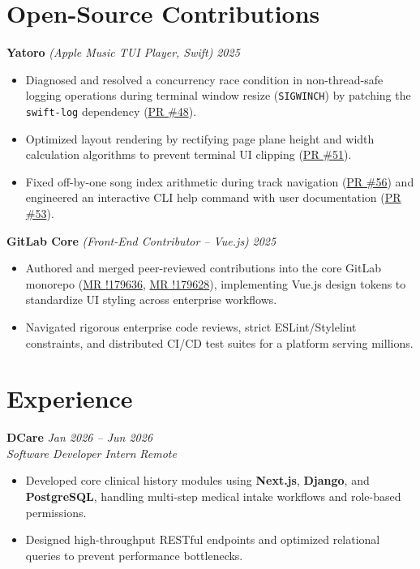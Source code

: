 \documentclass[10pt,a4paper]{article}
\begin{document}
\section{Open-Source Contributions}
\textbf{Yatoro} \textit{(Apple Music TUI Player, Swift)} \hfill \textit{2025}
\begin{itemize}
    \item Diagnosed and resolved a concurrency race condition in non-thread-safe logging operations during terminal window resize (\texttt{SIGWINCH}) by patching the \texttt{swift-log} dependency (\href{https://github.com/jayadamsmorgan/Yatoro/pull/48}{PR \#48}).
    \item Optimized layout rendering by rectifying page plane height and width calculation algorithms to prevent terminal UI clipping (\href{https://github.com/jayadamsmorgan/Yatoro/pull/51}{PR \#51}).
    \item Fixed off-by-one song index arithmetic during track navigation (\href{https://github.com/jayadamsmorgan/Yatoro/pull/56}{PR \#56}) and engineered an interactive CLI help command with user documentation (\href{https://github.com/jayadamsmorgan/Yatoro/pull/53}{PR \#53}).
\end{itemize}

\textbf{GitLab Core} \textit{(Front-End Contributor -- Vue.js)} \hfill \textit{2025}
\begin{itemize}
    \item Authored and merged peer-reviewed contributions into the core GitLab monorepo (\href{https://gitlab.com/gitlab-org/gitlab/-/merge_requests/179636}{MR !179636}, \href{https://gitlab.com/gitlab-org/gitlab/-/merge_requests/179628}{MR !179628}), implementing Vue.js design tokens to standardize UI styling across enterprise workflows.
    \item Navigated rigorous enterprise code reviews, strict ESLint/Stylelint constraints, and distributed CI/CD test suites for a platform serving millions.
\end{itemize}

\section{Experience}
\textbf{DCare} \hfill \textit{Jan 2026 -- Jun 2026} \\
\textit{Software Developer Intern} \hfill \textit{Remote}
\begin{itemize}
    \item Developed core clinical history modules using \textbf{Next.js}, \textbf{Django}, and \textbf{PostgreSQL}, handling multi-step medical intake workflows and role-based permissions.
    \item Designed high-throughput RESTful endpoints and optimized relational queries to prevent performance bottlenecks.
\end{itemize}
\end{document}
